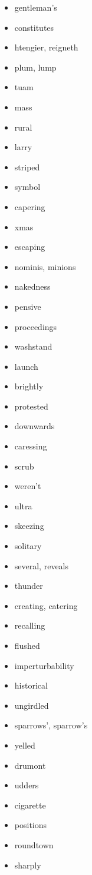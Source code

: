 \documentclass{article}
\begin{document}
\begin{itemize}
    \item gentleman's
    \item constitutes
    \item htengier, reigneth
    \item plum, lump
    \item tuam
    \item mass
    \item rural
    \item larry
    \item striped
    \item symbol
    \item capering
    \item xmas
    \item escaping
    \item nominis, minions
    \item nakedness
    \item pensive
    \item proceedings
    \item washstand
    \item launch
    \item brightly
    \item protested
    \item downwards
    \item caressing
    \item scrub
    \item weren't
    \item ultra
    \item skeezing
    \item solitary
    \item several, reveals
    \item thunder
    \item creating, catering
    \item recalling
    \item flushed
    \item imperturbability
    \item historical
    \item ungirdled
    \item sparrows', sparrow's
    \item yelled
    \item drumont
    \item udders
    \item cigarette
    \item positions
    \item roundtown
    \item sharply

\end{itemize}
\end{document}
